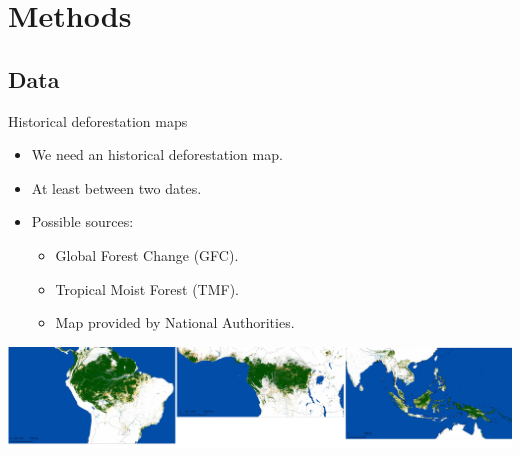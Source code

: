 \documentclass[10pt,table,dvipsnames,compress]{beamer}
\begin{document}
\section{Methods}
\label{sec:orgbc3e2a5}
\subsection{Data}
\label{sec:orgd024f4b}

\begin{frame}[label={sec:org9f549d7}]{Historical deforestation maps}
\begin{itemize}
\item We need an historical deforestation map.
\item At least between two dates.
\item Possible sources:
\begin{itemize}
\item Global Forest Change (GFC).
\item Tropical Moist Forest (TMF).
\item Map provided by National Authorities.
\end{itemize}
\end{itemize}

\vspace{0.25cm}
\centering \includegraphics[width=\textwidth]{figs/Vancutsem2021-maps-wide}
\end{frame}
\end{document}
